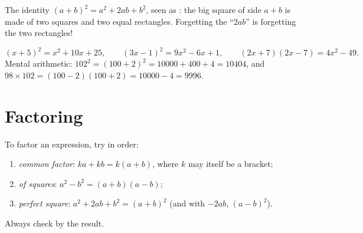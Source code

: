 \begin{omfigure}

{\small The identity $(a+b)^2 = a^2 + 2ab + b^2$, seen as : the big
square of side $a+b$ is made of two squares and two equal rectangles.
Forgetting the ``$2ab$'' is forgetting the two rectangles!}
\end{omfigure}

\begin{example}\label{ex:g9:algebra:identities}
\[
(x + 5)^2 = x^2 + 10x + 25, \qquad
(3x - 1)^2 = 9x^2 - 6x + 1, \qquad
(2x + 7)(2x - 7) = 4x^2 - 49 .
\]
Mental arithmetic: $102^2 = (100 + 2)^2 = 10000 + 400 + 4 = 10404$, and
$98 \times 102 = (100-2)(100+2) = 10000 - 4 = 9996$.
\end{example}

\section{Factoring}

\begin{method}[Factoring]\label{met:g9:algebra:factor}
To factor an expression, try in order:
\begin{enumerate}
  \item \emph{common factor}: $ka + kb = k(a + b)$, where $k$ may itself
        be a bracket;
  \item \emph{ of squares}: $a^2 - b^2 = (a+b)(a-b)$;
  \item \emph{perfect square}: $a^2 + 2ab + b^2 = (a+b)^2$ (and with
        $-2ab$, $(a-b)^2$).
\end{enumerate}
Always check by  the result.
\end{method}

